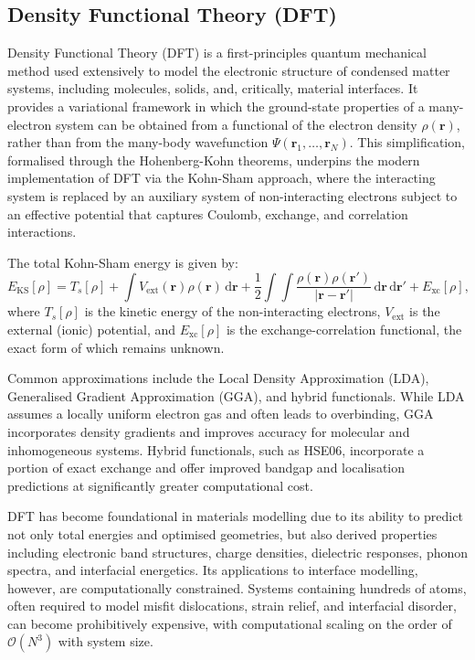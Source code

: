\subsection{Density Functional Theory (DFT)}

Density Functional Theory (DFT) is a first-principles quantum mechanical method used extensively to model the electronic structure of condensed matter systems, including molecules, solids, and, critically, material interfaces. It provides a variational framework in which the ground-state properties of a many-electron system can be obtained from a functional of the electron density $\rho(\mathbf{r})$, rather than from the many-body wavefunction $\Psi(\mathbf{r}_1, \dots, \mathbf{r}_N)$. This simplification, formalised through the Hohenberg-Kohn theorems, underpins the modern implementation of DFT via the Kohn-Sham approach, where the interacting system is replaced by an auxiliary system of non-interacting electrons subject to an effective potential that captures Coulomb, exchange, and correlation interactions.

The total Kohn-Sham energy is given by: \begin{equation} E_{\mathrm{KS}}[\rho] = T_s[\rho] + \int V_{\mathrm{ext}}(\mathbf{r}) \rho(\mathbf{r}) \, \mathrm{d}\mathbf{r} + \frac{1}{2} \int \int \frac{\rho(\mathbf{r}) \rho(\mathbf{r'})}{|\mathbf{r} - \mathbf{r'}|} \, \mathrm{d}\mathbf{r} \, \mathrm{d}\mathbf{r'} + E_{\mathrm{xc}}[\rho], \end{equation} where $T_s[\rho]$ is the kinetic energy of the non-interacting electrons, $V_{\mathrm{ext}}$ is the external (ionic) potential, and $E_{\mathrm{xc}}[\rho]$ is the exchange-correlation functional, the exact form of which remains unknown.

Common approximations include the Local Density Approximation (LDA), Generalised Gradient Approximation (GGA), and hybrid functionals. While LDA assumes a locally uniform electron gas and often leads to overbinding, GGA incorporates density gradients and improves accuracy for molecular and inhomogeneous systems. Hybrid functionals, such as HSE06, incorporate a portion of exact exchange and offer improved bandgap and localisation predictions at significantly greater computational cost.

DFT has become foundational in materials modelling due to its ability to predict not only total energies and optimised geometries, but also derived properties including electronic band structures, charge densities, dielectric responses, phonon spectra, and interfacial energetics. Its applications to interface modelling, however, are computationally constrained. Systems containing hundreds of atoms, often required to model misfit dislocations, strain relief, and interfacial disorder, can become prohibitively expensive, with computational scaling on the order of $\mathcal{O}(N^3)$ with system size.


